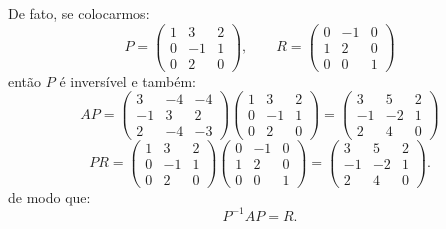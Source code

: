 \documentclass[11pt,a4paper]{article}
\begin{document}
\medskip
\noindent
De fato, se colocarmos:
\[
P = \begin{pmatrix}
1 & 3 & 2\\
0 & -1 & 1\\
0 & 2 & 0
\end{pmatrix},\quad\quad R=\begin{pmatrix}
0 & -1 & 0 \\
1 & 2 & 0 \\
0 & 0 & 1
\end{pmatrix}
\]
então $P$ é inversível e também:
\[
AP = \begin{pmatrix}
3 & -4 & -4 \\
-1 & 3 & 2 \\
2 & -4 & -3
\end{pmatrix}\begin{pmatrix}
1 & 3 & 2\\
0 & -1& 1\\
0 & 2 & 0
\end{pmatrix} = \begin{pmatrix}
3 & 5 & 2 \\
-1 & -2 & 1 \\
2 & 4 & 0
\end{pmatrix}
\]
\[
PR = \begin{pmatrix}
1 & 3 & 2\\
0 & -1& 1\\
0 & 2 & 0
\end{pmatrix}\begin{pmatrix}
0 & -1 & 0 \\
1 & 2 & 0 \\
0 & 0 & 1
\end{pmatrix} = \begin{pmatrix}
3 & 5 & 2 \\
-1 & -2 & 1 \\
2 & 4 & 0
\end{pmatrix}.
\]
de modo que:
\[
P^{-1}AP = R.
\]
\end{document}
